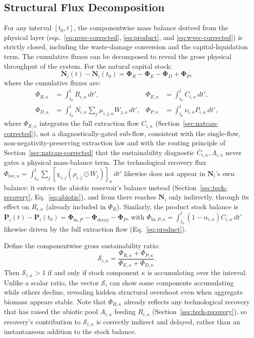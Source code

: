 \documentclass[twocolumn,10pt]{article}
\begin{document}
\subsection{Structural Flux Decomposition}
For any interval \([t_0,t]\), the componentwise mass balance derived from the physical layer (eqs.~\ref{eq:nvec-corrected}, \ref{eq:product}, and \ref{eq:wvec-corrected}) is strictly closed, including the waste-damage conversion and the capital-liquidation term. The cumulative fluxes can be decomposed to reveal the gross physical throughput of the system. For the natural capital stock:
\[
\mathbf{N}_i(t) - \mathbf{N}_i(t_0) = \boldsymbol{\Phi}_R - \boldsymbol{\Phi}_E - \boldsymbol{\Phi}_D + \boldsymbol{\Phi}_P,
\]
where the cumulative fluxes are:
\begin{align*}
\Phi_{R,\kappa} &= \int_{t_0}^t R_{i,\kappa}\,dt', & \Phi_{E,\kappa} &= \int_{t_0}^t C_{i,\kappa}\,dt', \\
\Phi_{D,\kappa} &= \int_{t_0}^t N_{i,\kappa} \sum_j \mu_{i,j,\kappa} W_{j,\kappa}\,dt', & \Phi_{P,\kappa} &= \int_{t_0}^t \nu_{i,\kappa} P_{i,\kappa}\,dt',
\end{align*}
where $\Phi_{E,\kappa}$ integrates the full extraction flow $C_{i,\kappa}$ (Section~\ref{sec:natcap-corrected}), not a diagnostically-gated sub-flow, consistent with the single-flow, non-negativity-preserving extraction law and with the routing principle of Section~\ref{sec:natcap-corrected} that the sustainability diagnostic $\bar C_{i,\kappa},\Lambda_{i,\kappa}$ never gates a physical mass-balance term. The technological recovery flux $\Phi_{\text{rec},\kappa}=\int_{t_0}^t\sum_j[\chi_{i,j}(\rho_{i,j}\odot W_j)]_\kappa\,dt'$ likewise does not appear in $\mathbf N_i$'s own balance: it enters the abiotic reservoir's balance instead (Section~\ref{sec:tech-recovery}, Eq.~\eqref{eq:abiotic}), and from there reaches $\mathbf N_i$ only indirectly, through its effect on $R_{i,\kappa}$ (already included in $\Phi_R$). Similarly, the product stock balance is \(\mathbf{P}_i(t) - \mathbf{P}_i(t_0) = \boldsymbol{\Phi}_{\text{in}, P} - \boldsymbol{\Phi}_{\text{decay}} - \boldsymbol{\Phi}_P\), with $\Phi_{\text{in},P,\kappa}=\int_{t_0}^t(1-\alpha_{i,\kappa})C_{i,\kappa}\,dt'$ likewise driven by the full extraction flow (Eq.~\eqref{eq:product}).

Define the componentwise gross sustainability ratio:
\[
\mathcal{S}_{i,\kappa} = \frac{\Phi_{R,\kappa} + \Phi_{P,\kappa}}{\Phi_{E,\kappa} + \Phi_{D,\kappa}}.
\]
Then \(\mathcal{S}_{i,\kappa} > 1\) if and only if stock component \(\kappa\) is accumulating over the interval. Unlike a scalar ratio, the vector \(\boldsymbol{\mathcal{S}}_i\) can show some components accumulating while others decline, revealing hidden structural overshoot even when aggregate biomass appears stable. Note that $\Phi_{R,\kappa}$ already reflects any technological recovery that has raised the abiotic pool $A_{i,\kappa}$ feeding $R_{i,\kappa}$ (Section~\ref{sec:tech-recovery}), so recovery's contribution to $\mathcal S_{i,\kappa}$ is correctly indirect and delayed, rather than an instantaneous addition to the stock balance.
\end{document}
